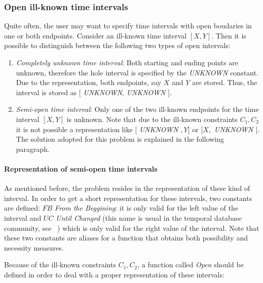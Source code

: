 \subsubsection{\label{subsubsec:open-interval}Open ill-known time intervals}
Quite often, the user may want to specify time intervals with open boudaries in one or both endpoints. Consider an ill-known time interval $\left[X, Y\right]$. Then it is possible to distinguish between the following two types of open intervals:
\begin{enumerate}
\item
\emph{Completely unknown time interval}: Both starting and ending points are unknown, therefore the hole interval is specified by the \emph{UNKNOWN} constant. Due to the representation, both endpoints, say $X$ and $Y$ are stored. Thus, the interval is stored as $[$ \emph{UNKNOWN}, \emph{UNKNOWN} $]$.
\item
\emph{Semi-open time interval}: Only one of the two ill-known endpoints for the time interval $\left[X, Y\right]$ is unknown. Note that due to the ill-known constraints $C_{1}, C_{2}$ it is not possible a representation like $[$ \emph{UNKNOWN} $, Y]$ or $[X, $ \emph{UNKNOWN} $]$. The solution adopted for this problem is explained in the following paragraph.
\end{enumerate}

\paragraph{Representation of semi-open time intervals}
As mentioned before, the problem resides in the representation of these kind of interval. In order to get a short representation for these intervals, two constants are defined: $FB$ \emph{From the Beggining}: it is only valid for the left value of the interval and $UC$ \emph{Until Changed} (this name is usual in the temporal database community, see ~\cite{Jensen1994}) which is only valid for the right value of the interval. Note that these two constants are aliases for a function that obtains both possibility and necessity measures. 

Because of the ill-known constraints $C_{1}, C_{2}$, a function called \emph{Open} should be defined in order to deal with a proper representation of these intervals:

